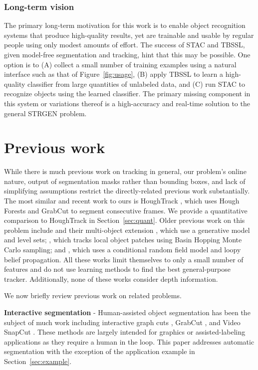 \documentclass[journal]{IEEEtran}
\begin{document}
\subsubsection{Long-term vision}

The primary long-term motivation for this work is to enable object recognition systems that produce high-quality results, yet are trainable and usable by regular people using only modest amounts of effort. The success of STAC and TBSSL, given model-free segmentation and tracking, hint that this may be possible.  One option is to (A) collect a small number of training examples using a natural interface such as that of Figure~\ref{fig:usage}, (B) apply TBSSL to learn a high-quality classifier from large quantities of unlabeled data, and (C) run STAC to recognize objects using the learned classifier.  The primary missing component in this system or variations thereof is a high-accuracy and real-time solution to the general STRGEN problem.

\section{Previous work}
\label{sec:prev_work}

While there is much previous work on tracking in general, our problem's online nature, output of segmentation masks rather than bounding boxes, and lack of simplifying assumptions restrict the directly-related previous work substantially.  The most similar and recent work to ours is HoughTrack \cite{godec2011a}, which uses Hough Forests and GrabCut to segment consecutive frames.  We provide a quantitative comparison to HoughTrack in Section~\ref{sec:quant}.  Older previous work on this problem include \cite{bibby2008a} and their multi-object extension \cite{bibby2010a}, which use a generative model and level sets; \cite{kwon2009a}, which tracks local object patches using Basin Hopping Monte Carlo sampling; and \cite{ren2007a}, which uses a conditional random field model and loopy belief propagation. All these works limit themselves to only a small number of features and do not use learning methods to find the best general-purpose tracker.  Additionally, none of these works consider depth information.

We now briefly review previous work on related problems.

\textbf{Interactive segmentation} - Human-assisted object segmentation has been the subject of much work including interactive graph cuts \cite{boykov2001a}, GrabCut \cite{rother2004a}, and Video SnapCut \cite{bai2009a}.  These methods are largely intended for graphics or assisted-labeling applications as they require a human in the loop.  This paper addresses automatic segmentation with the exception of the application example in Section~\ref{sec:example}.
\end{document}

